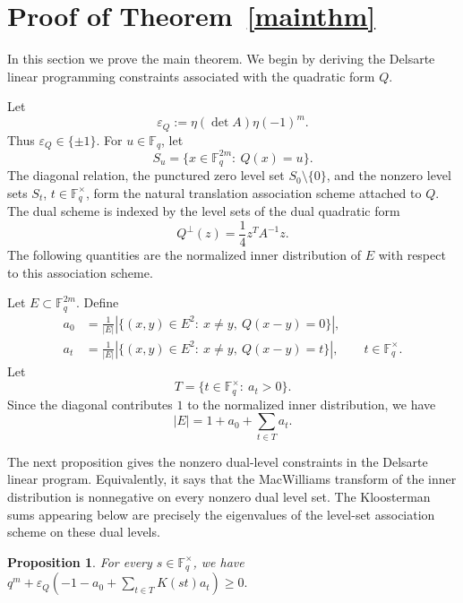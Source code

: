 \documentclass[11pt]{article}
\newtheorem{proposition}[theorem]{Proposition}
\newcommand{\F}{\mathbb{F}}
\newcommand{\1}{\mathbf{1}}
\begin{document}
\section{Proof of Theorem~\ref{mainthm}}\label{main}

In this section we prove the main theorem. We begin by deriving the
Delsarte linear programming constraints associated with the quadratic form
\(Q\).

Let
\[
\varepsilon_Q:=\eta(\det A)\eta(-1)^m.
\]
Thus \(\varepsilon_Q\in\{\pm1\}\). For \(u\in\F_q\), let
\[
S_u=\{x\in\F_q^{2m}:\ Q(x)=u\}.
\]
The diagonal relation, the punctured zero level set \(S_0\setminus\{0\}\),
and the nonzero level sets \(S_t\), \(t\in\F_q^\times\), form the natural
translation association scheme attached to \(Q\). The dual scheme is indexed
by the level sets of the dual quadratic form
\[
Q^\perp(z)=\frac14 z^T A^{-1}z.
\]
The following quantities are the normalized inner distribution of \(E\) with
respect to this association scheme.

Let \(E\subset\F_q^{2m}\). Define
\begin{align*}
	a_0
	&=
	\frac{1}{|E|}
	\left|
	\{(x,y)\in E^2:\ x\ne y,\ Q(x-y)=0\}
	\right|,\\
	a_t
	&=
	\frac{1}{|E|}
	\left|
	\{(x,y)\in E^2:\ x\ne y,\ Q(x-y)=t\}
	\right|,
	\qquad t\in\F_q^\times.
\end{align*}
Let
\[
T=\{t\in\F_q^\times:\ a_t>0\}.
\]
Since the diagonal contributes \(1\) to the normalized inner distribution, we
have
\[
|E|=1+a_0+\sum_{t\in T}a_t.
\]

The next proposition gives the nonzero dual-level constraints in the
Delsarte linear program. Equivalently, it says that the MacWilliams transform
of the inner distribution is nonnegative on every nonzero dual level set.
The Kloosterman sums appearing below are precisely the eigenvalues of the
level-set association scheme on these dual levels.

\begin{proposition}\label{prop-lp-constraints}
	For every \(s\in\F_q^\times\), we have $q^m+\varepsilon_Q
	\left(
	-1-a_0+\sum_{t\in T}K(st)a_t
	\right)
	\ge0.$
\end{proposition}
\end{document}
